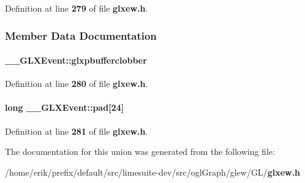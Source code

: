 Definition at line {\bf 279} of file {\bf glxew.\+h}.



\subsubsection{Member Data Documentation}
\paragraph[{glxpbufferclobber}]{ \+\_\+\+\_\+\+G\+L\+X\+Event\+::glxpbufferclobber}\label{union____GLXEvent_ada5880e2b424bcb2f60a411aaf713fae}


Definition at line {\bf 280} of file {\bf glxew.\+h}.

\paragraph[{pad}]{\setlength{\rightskip}{0pt plus 5cm}long \+\_\+\+\_\+\+G\+L\+X\+Event\+::pad[24]}\label{union____GLXEvent_a1cb8f6e7e77a34d25baf43b3f3bc2d4f}


Definition at line {\bf 281} of file {\bf glxew.\+h}.



The documentation for this union was generated from the following file\+:\begin{DoxyCompactItemize}
\item 
/home/erik/prefix/default/src/limesuite-\/dev/src/ogl\+Graph/glew/\+G\+L/{\bf glxew.\+h}\end{DoxyCompactItemize}
